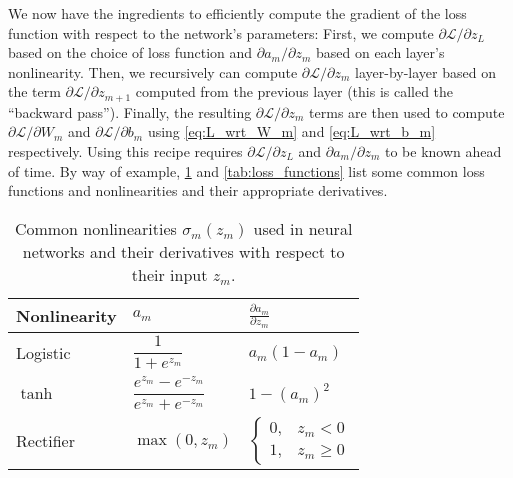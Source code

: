 We now have the ingredients to efficiently compute the gradient of the loss function with respect to the network's parameters: First, we compute $\partial \mathcal{L}/\partial z_L$ based on the choice of loss function and $\partial a_m/\partial z_m$ based on each layer's nonlinearity.
Then, we recursively can compute $\partial \mathcal{L}/\partial z_m$ layer-by-layer based on the term $\partial \mathcal{L}/\partial z_{m + 1}$ computed from the previous layer (this is called the ``backward pass'').
Finally, the resulting $\partial \mathcal{L}/\partial z_m$ terms are then used to compute $\partial \mathcal{L}/\partial W_m$ and $\partial \mathcal{L}/\partial b_m$ using \cref{eq:L_wrt_W_m} and \cref{eq:L_wrt_b_m} respectively.
Using this recipe requires $\partial \mathcal{L}/\partial z_L$ and $\partial a_m/\partial z_m$ to be known ahead of time.
By way of example, \cref{tab:nonlinearities} and \cref{tab:loss_functions} list some common loss functions and nonlinearities and their appropriate derivatives.

\begin{table}
\begin{center}
\begin{tabular}{lll}
  \toprule
  Nonlinearity & $a_m$                                            & $\frac{\partial a_m}{\partial z_m}$                   \\
  \midrule
  Logistic     & $\dfrac{1}{1 + e^{z_m}}$                         & $a_m(1 - a_m)$                                        \\[1.2ex]
  $\tanh$      & $\dfrac{e^{z_m} - e^{-z_m}}{e^{z_m} + e^{-z_m}}$ & $1 - (a_m)^2$                                         \\[1.2ex]
  Rectifier    & $\max(0, z_m)$                                   & $\begin{cases}0,& z_m < 0\\ 1,& z_m \ge 0\end{cases}$ \\
  \bottomrule
\end{tabular}
\end{center}
\caption[Common nonlinearities used in neural networks]{Common nonlinearities $\sigma_m(z_m)$ used in neural networks and their derivatives with respect to their input $z_m$.}
  \label{tab:nonlinearities}
\end{table}

